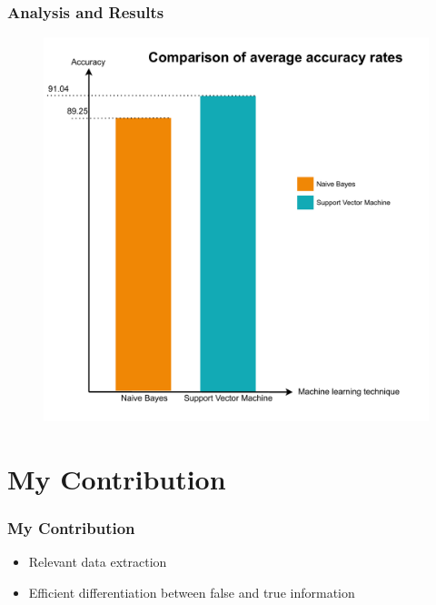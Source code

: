 \documentclass{beamer}
\begin{document}
\begin{frame}[fragile=singleslide]\frametitle{Analysis and Results}
\begin{figure}
\centering
\includegraphics[scale=.35]{average_accuracy.pdf}
\end{figure}
\end{frame}

\section{My Contribution}

\begin{frame}[fragile=singleslide]\frametitle{My Contribution}
\begin{itemize}[label=$\bullet$]
\item Relevant data extraction
\item Efficient differentiation between false and true information
\end{itemize}
\end{frame}
\end{document}
